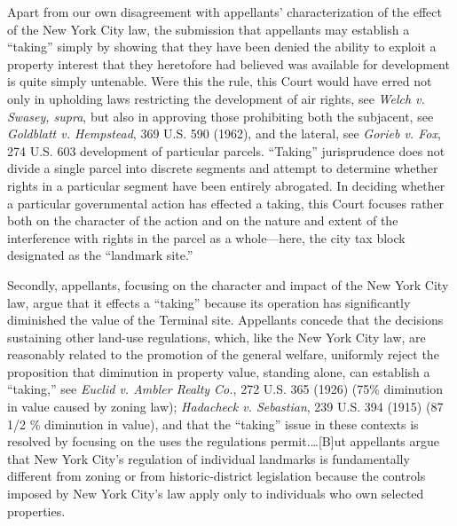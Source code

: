Apart from our own disagreement with appellants' characterization of the effect
of the New York City law, the submission that appellants may establish a
``taking'' simply by showing that they have been denied the ability to exploit a
property interest that they heretofore had believed was available for
development is quite simply untenable. Were this the rule, this Court would have
erred not only in upholding laws restricting the development of air rights, see
\textit{Welch v. Swasey, supra}, but also in approving those prohibiting both
the subjacent, see \textit{Goldblatt v. Hempstead}, 369 U.S. 590 (1962), and the
lateral, see \textit{Gorieb v. Fox}, 274 U.S. 603 development of particular
parcels. ``Taking'' jurisprudence does not divide a single parcel into discrete
segments and attempt to determine whether rights in a particular segment have
been entirely abrogated. In deciding whether a particular governmental action
has effected a taking, this Court focuses rather both on the character of the
action and on the nature and extent of the interference with rights in the
parcel as a whole---here, the city tax block designated as the ``landmark
site.''

Secondly, appellants, focusing on the character and impact of the New York City
law, argue that it effects a ``taking'' because its operation has significantly
diminished the value of the Terminal site. Appellants concede that the decisions
sustaining other land-use regulations, which, like the New York City law, are
reasonably related to the promotion of the general welfare, uniformly reject the
proposition that diminution in property value, standing alone, can establish a
``taking,'' see \textit{Euclid v. Ambler Realty Co.}, 272 U.S. 365 (1926) (75\%
diminution in value caused by zoning law); \textit{Hadacheck v. Sebastian}, 239
U.S. 394 (1915) (87 1/2 \% diminution in value), and that the ``taking'' issue
in these contexts is resolved by focusing on the uses the regulations
permit.\ldots [B]ut appellants argue that New York City's regulation of
individual landmarks is fundamentally different from zoning or from
historic-district legislation because the controls imposed by New York City's
law apply only to individuals who own selected properties.

